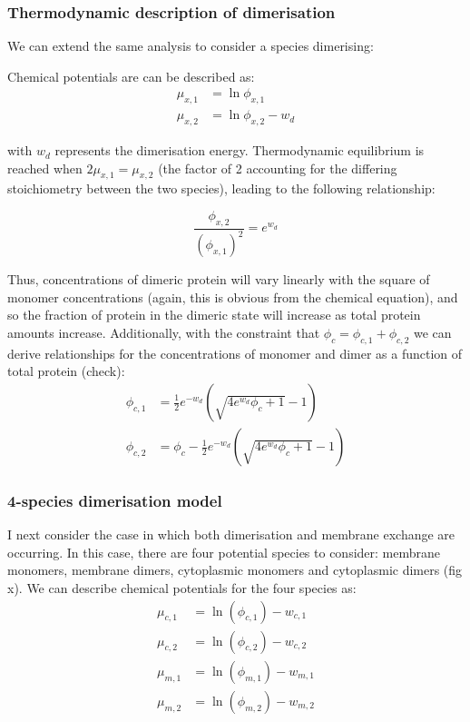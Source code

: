 \documentclass[12pt]{"article"}
\begin{document}
\subsubsection{Thermodynamic description of dimerisation}

We can extend the same analysis to consider a species dimerising:

\begin{center}
\end{center}

Chemical potentials are can be described as:
\begin{align}
\mu_{x,1} &= \ln\phi_{x,1}\\
\mu_{x,2} &= \ln\phi_{x,2} - w_d
\end{align} 

with $w_d$ represents the dimerisation energy. Thermodynamic equilibrium is reached when $2\mu_{x,1} = \mu_{x,2}$ (the factor of 2 accounting for the differing stoichiometry between the two species), leading to the following relationship:

\begin{equation}
\frac{\phi_{x,2}}{(\phi_{x,1})^2} = e^{w_d}
\end{equation}

Thus, concentrations of dimeric protein will vary linearly with the square of monomer concentrations (again, this is obvious from the chemical equation), and so the fraction of protein in the dimeric state will increase as total protein amounts increase. Additionally, with the constraint that $\phi_c = \phi_{c,1} + \phi_{c,2}$ we can derive relationships for the concentrations of monomer and dimer as a function of total protein (check):
\begin{align}
\phi_{c,1} &= \frac{1}{2}e^{-w_d}\left(\sqrt{4e^{w_d}\phi_c + 1} - 1\right)\\
\phi_{c,2} &= \phi_c - \frac{1}{2}e^{-w_d}\left(\sqrt{4e^{w_d}\phi_c + 1} - 1\right)
\end{align}

\subsubsection{4-species dimerisation model}

I next consider the case in which both dimerisation and membrane exchange are occurring. In this case, there are four potential species to consider: membrane monomers, membrane dimers, cytoplasmic monomers and cytoplasmic dimers (fig x). We can describe chemical potentials for the four species as:
\begin{align}
\mu_{c,1} &= \ln(\phi_{c,1}) - w_{c,1}\\
\mu_{c,2} &= \ln(\phi_{c,2}) - w_{c,2}\\
\mu_{m,1} &= \ln(\phi_{m,1}) - w_{m,1}\\
\mu_{m,2} &= \ln(\phi_{m,2}) - w_{m,2}
\end{align}
\end{document}
